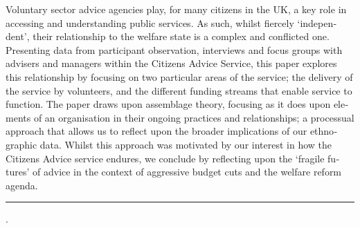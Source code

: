     \begin{adjustwidth}{20mm}{20mm}
\label{paper5:abstract}
    \bigskip
    \begin{otherlanguage}{english}
    {\small

\noindent Voluntary sector advice agencies play, for many citizens in the UK, a key role in accessing and understanding public services. As such, whilst fiercely ‘independent’, their relationship to the welfare state is a complex and conflicted one. Presenting data from participant observation, interviews and focus groups with advisers and managers within the Citizens Advice Service, this paper explores this relationship by focusing on two particular areas of the service; the delivery of the service by volunteers, and the different funding streams that enable service to function. The paper draws upon assemblage theory, focusing as it does upon elements of an organisation in their ongoing practices and relationships; a processual approach that allows us to reflect upon the broader implications of our ethnographic data. Whilst this approach was motivated by our interest in how the Citizens Advice service endures, we conclude by reflecting upon the ‘fragile futures’ of advice in the context of aggressive budget cuts and the welfare reform agenda.

\smallskip
\noindent\rule{\linewidth}{1pt}

%
\hspace*{0.75em}{%
advice agencies;
assemblages;
regulation;
legal actors;
voluntary sector;
volunteers}.





    } %


    \end{otherlanguage}

    \end{adjustwidth}